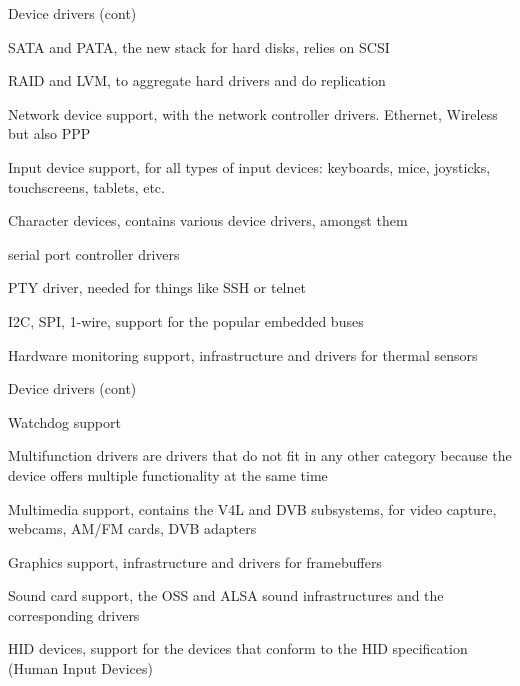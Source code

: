   \startitemize
  \item Device drivers (cont)
    \startitemize
    \item SATA and PATA, the new stack for hard disks, relies on SCSI
    \item RAID and LVM, to aggregate hard drivers and do replication
    \item Network device support, with the network controller
      drivers. Ethernet, Wireless but also PPP
    \item Input device support, for all types of input devices:
      keyboards, mice, joysticks, touchscreens, tablets, etc.
    \item Character devices, contains various device drivers, amongst
      them
      \startitemize
      \item serial port controller drivers
      \item PTY driver, needed for things like SSH or telnet
      \stopitemize
    \item I2C, SPI, 1-wire, support for the popular embedded buses
    \item Hardware monitoring support, infrastructure and drivers for
      thermal sensors
    \stopitemize
  \stopitemize

  \startitemize
  \item Device drivers (cont)
    \startitemize
    \item Watchdog support
    \item Multifunction drivers are drivers that do not fit in any
      other category because the device offers multiple functionality
      at the same time
    \item Multimedia support, contains the V4L and DVB subsystems, for
      video capture, webcams, AM/FM cards, DVB adapters
    \item Graphics support, infrastructure and drivers for
      framebuffers
    \item Sound card support, the OSS and ALSA sound infrastructures
      and the corresponding drivers
    \item HID devices, support for the devices that conform to the HID
      specification (Human Input Devices)
    \stopitemize
  \stopitemize


